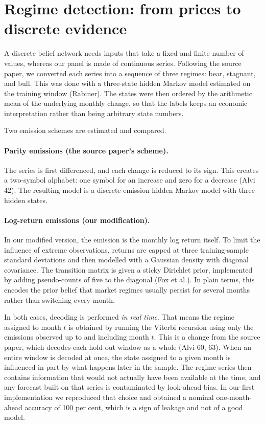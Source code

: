 \documentclass[11pt,a4paper]{article}
\begin{document}
\section{Regime detection: from prices to discrete evidence}
\label{sec:regimes}

A discrete belief network needs inputs that take a fixed and finite number of values, whereas our
panel is made of continuous series. Following the source paper, we converted each
series into a sequence of three regimes: bear, stagnant, and bull. This was done with a
three-state hidden Markov model estimated on the training window (Rabiner). The states were then ordered by
the arithmetic mean of the underlying monthly change, so that the labels keeps an economic
interpretation rather than being arbitrary state numbers.

Two emission schemes are estimated and compared.

\paragraph{Parity emissions (the source paper's scheme).} The series is first differenced, and each
change is reduced to its sign. This creates a two-symbol alphabet: one symbol for an increase and
zero for a decrease (Alvi 42). The resulting model is a discrete-emission hidden Markov model
with three hidden states.

\paragraph{Log-return emissions (our modification).} In our modified version, the emission is the
monthly log return itself. To limit the influence of extreme observations, returns are capped at
three training-sample standard deviations and then modelled with a Gaussian density with diagonal
covariance. The transition matrix is given a sticky Dirichlet prior, implemented by adding
pseudo-counts of five to the diagonal (Fox et al.). In plain terms, this encodes the prior belief that market
regimes usually persist for several months rather than switching every month.

In both cases, decoding is performed \textit{in real time}. That means the regime assigned to month
$t$ is obtained by running the Viterbi recursion using only the emissions observed up to and
including month $t$. This is a change from the source paper, which
decodes each hold-out window as a whole (Alvi 60, 63). When an entire window is decoded at once,
the state assigned to a given month is influenced in part by what happens later in the sample. The
regime series then contains information that would not actually have been available at the time,
and any forecast built on that series is contaminated by look-ahead bias. In our first
implementation we reproduced that choice and obtained a nominal one-month-ahead accuracy of
100 per cent, which is a sign of leakage and not of a good model.
\end{document}
